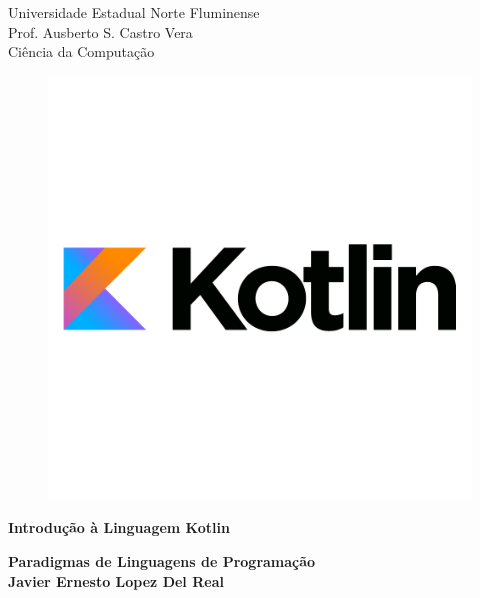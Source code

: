 \documentclass[11pt]{../classes/ifscarticle}
\begin{document}
\begin{center}
    
    {\large Universidade Estadual Norte Fluminense}\\[0.2cm] %
    {\large Prof. Ausberto S. Castro Vera  }\\[0.2cm] %
    {\large Ciência da Computação}\\[2.2cm]
    \begin{figure}[ht]
        \centering
        \includegraphics[width=.6\linewidth]{images/kotlin-logo.png}\\[2cm]
    \end{figure}
    
    {\Huge \bfseries Introdução à Linguagem Kotlin}

    \vspace{.5cm}

    {\large \bfseries Paradigmas de Linguagens de Programação}\\[2.2cm]
    
    {\LARGE \bfseries Javier Ernesto Lopez Del Real}
\end{center}
\end{document}

